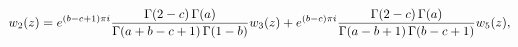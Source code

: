 \[w_{2}(z)=e^{(b-c+1)\pi i}\frac{\mathop{\Gamma\/}\nolimits\!\left(2-c\right)%
\mathop{\Gamma\/}\nolimits\!\left(a\right)}{\mathop{\Gamma\/}\nolimits\!\left(%
a+b-c+1\right)\mathop{\Gamma\/}\nolimits\!\left(1-b\right)}w_{3}(z)+e^{(b-c)%
\pi i}\frac{\mathop{\Gamma\/}\nolimits\!\left(2-c\right)\mathop{\Gamma\/}%
\nolimits\!\left(a\right)}{\mathop{\Gamma\/}\nolimits\!\left(a-b+1\right)%
\mathop{\Gamma\/}\nolimits\!\left(b-c+1\right)}w_{5}(z),\]